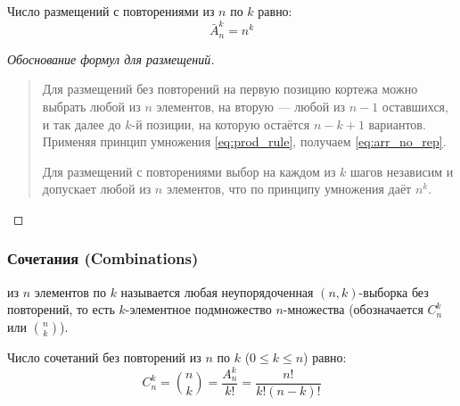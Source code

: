 \begin{proposition}
    Число размещений с повторениями из $n$ по $k$ равно:
    \begin{equation} \label{eq:arr_rep}
        \bar{A}_n^k = n^k \tag{9}
    \end{equation}
\end{proposition}

\begin{proof}[Обоснование формул для размещений]~\\
    \begin{quote}
        Для размещений без повторений на первую позицию кортежа можно 
        выбрать любой из $n$ элементов, на вторую --- любой из $n - 1$ 
        оставшихся, и так далее до $k$-й позиции, на которую остаётся 
        $n - k + 1$ вариантов. Применяя принцип умножения \eqref{eq:prod_rule}, 
        получаем \eqref{eq:arr_no_rep}.

        Для размещений с повторениями выбор на каждом из $k$ шагов 
        независим и допускает любой из $n$ элементов, что по принципу 
        умножения даёт $n^k$.
    \end{quote}
\end{proof}

\subsubsection{Сочетания (Combinations)}

\begin{definition}
     из $n$ элементов по $k$ называется 
    любая неупорядоченная $(n, k)$-выборка без повторений, то есть 
    $k$-элементное подмножество $n$-множества (обозначается $C_n^k$ или 
    $\binom{n}{k}$).
\end{definition}

\begin{proposition}
    Число сочетаний без повторений из $n$ по $k$ ($0 \le k \le n$) равно:
    \begin{equation} \label{eq:comb_no_rep}
        C_n^k = \binom{n}{k} = \frac{A_n^k}{k!} = \frac{n!}{k!(n - k)!} \tag{10}
    \end{equation}
\end{proposition}

